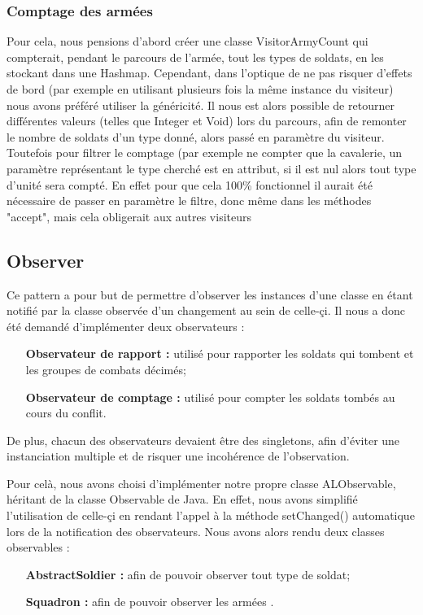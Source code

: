 \documentclass[12pt]{article}
\begin{document}
\subsubsection{Comptage des armées}
Pour cela, nous pensions d'abord créer une classe VisitorArmyCount qui compterait, 
pendant le parcours de l'armée, tout les types de soldats, en les stockant dans 
une Hashmap. Cependant, dans l'optique de ne pas risquer d'effets de bord (par 
exemple en utilisant plusieurs fois la même instance du visiteur) nous avons 
préféré utiliser la généricité. Il nous est alors possible de retourner 
différentes valeurs (telles que Integer et Void) lors du parcours, afin de 
remonter le nombre de soldats d'un type donné, alors passé en paramètre du 
visiteur. Toutefois pour filtrer le comptage (par exemple ne compter que la 
cavalerie, un paramètre représentant le type cherché est en attribut, si il est 
nul alors tout type d'unité sera compté. En effet pour que cela 100\% 
fonctionnel il aurait été nécessaire de passer en paramètre le filtre, donc même
dans les méthodes "accept", mais cela obligerait aux autres visiteurs
\subsection{Observer}
Ce pattern a pour but de permettre d'observer les instances d'une classe en étant notifié par la classe observée d'un changement au sein de celle-çi. Il nous a donc été demandé d'implémenter deux observateurs :
\begin{enumerate}
\item[\textbf{Observateur de rapport :}] utilisé pour rapporter les soldats qui tombent et les groupes de combats décimés; 
\item[\textbf{Observateur de comptage :}] utilisé pour compter les soldats tombés au cours du conflit. 
\end{enumerate}
De plus, chacun des observateurs devaient être des singletons, afin d'éviter une instanciation multiple et de risquer une incohérence de l'observation.

Pour celà, nous avons choisi d'implémenter notre propre classe ALObservable, héritant de la classe Observable de Java. En effet, nous avons simplifié l'utilisation de celle-çi en rendant l'appel à la méthode setChanged() automatique lors de la notification des observateurs.
Nous avons alors rendu deux classes observables :
\begin{enumerate}
\item[\textbf{AbstractSoldier :}] afin de pouvoir observer tout type de soldat;
\item[\textbf{Squadron :}] afin de pouvoir observer les armées .
\end{enumerate}
\end{document}
